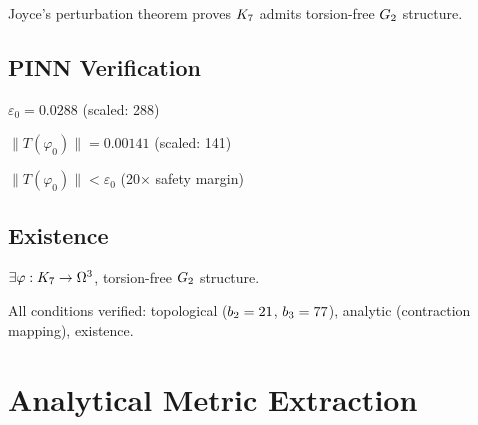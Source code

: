 Joyce's perturbation theorem proves $K_7$ admits torsion-free $G_2$ structure.

\section{PINN Verification}

\begin{definition}\label{def:joyce_epsilon}
    \leanok
    $\varepsilon_0 = 0.0288$ (scaled: 288)
\end{definition}

\begin{definition}\label{def:pinn_torsion}
    \leanok
    $\|T(\varphi_0)\| = 0.00141$ (scaled: 141)
\end{definition}

\begin{theorem}\label{thm:pinn_below}
    \leanok
    $\|T(\varphi_0)\| < \varepsilon_0$ (20$\times$ safety margin)
\end{theorem}

\section{Existence}

\begin{theorem}\label{thm:k7_torsion_free}
    \leanok
    $\exists \varphi : K_7 \to \Omega^3$, torsion-free $G_2$ structure.
\end{theorem}

\begin{theorem}\label{thm:joyce_cert}
    \leanok
    All conditions verified: topological ($b_2 = 21$, $b_3 = 77$),
    analytic (contraction mapping), existence.
\end{theorem}

\chapter{Analytical Metric Extraction}\label{chap:analytical}

